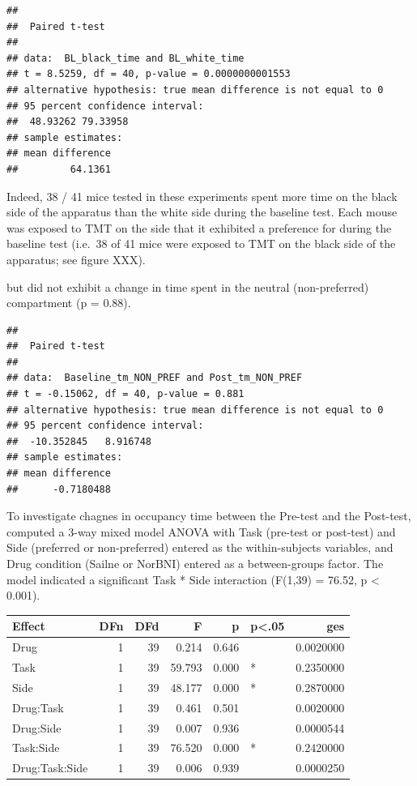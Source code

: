 \documentclass[
]{book}
\begin{document}
\begin{verbatim}
## 
##  Paired t-test
## 
## data:  BL_black_time and BL_white_time
## t = 8.5259, df = 40, p-value = 0.0000000001553
## alternative hypothesis: true mean difference is not equal to 0
## 95 percent confidence interval:
##  48.93262 79.33958
## sample estimates:
## mean difference 
##         64.1361
\end{verbatim}

Indeed, 38 / 41 mice tested in these experiments spent more time on the black side of the apparatus than the white side during the baseline test. Each mouse was exposed to TMT on the side that it exhibited a preference for during the baseline test (i.e.~38 of 41 mice were exposed to TMT on the black side of the apparatus; see figure XXX).

but did not exhibit a change in time spent in the neutral (non-preferred) compartment (p = 0.88).

\begin{verbatim}
## 
##  Paired t-test
## 
## data:  Baseline_tm_NON_PREF and Post_tm_NON_PREF
## t = -0.15062, df = 40, p-value = 0.881
## alternative hypothesis: true mean difference is not equal to 0
## 95 percent confidence interval:
##  -10.352845   8.916748
## sample estimates:
## mean difference 
##      -0.7180488
\end{verbatim}

To investigate chagnes in occupancy time between the Pre-test and the Post-test, computed a 3-way mixed model ANOVA with Task (pre-test or post-test) and Side (preferred or non-preferred) entered as the within-subjects variables, and Drug condition (Sailne or NorBNI) entered as a between-groups factor. The model indicated a significant Task * Side interaction (F(1,39) = 76.52, p \textless{} 0.001).

\begin{tabular}{l|r|r|r|r|l|r}
\hline
Effect & DFn & DFd & F & p & p<.05 & ges\\
\hline
Drug & 1 & 39 & 0.214 & 0.646 &  & 0.0020000\\
\hline
Task & 1 & 39 & 59.793 & 0.000 & * & 0.2350000\\
\hline
Side & 1 & 39 & 48.177 & 0.000 & * & 0.2870000\\
\hline
Drug:Task & 1 & 39 & 0.461 & 0.501 &  & 0.0020000\\
\hline
Drug:Side & 1 & 39 & 0.007 & 0.936 &  & 0.0000544\\
\hline
Task:Side & 1 & 39 & 76.520 & 0.000 & * & 0.2420000\\
\hline
Drug:Task:Side & 1 & 39 & 0.006 & 0.939 &  & 0.0000250\\
\hline
\end{tabular}
\end{document}
